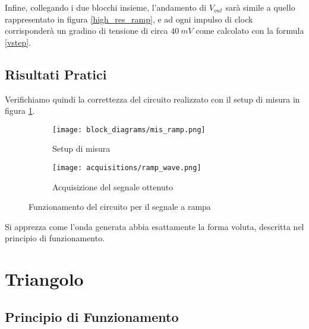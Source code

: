 Infine, collegando i due blocchi insieme, l'andamento di $V_{out}$ sarà simile a quello
rappresentato in figura \ref{high_res_ramp}, e ad ogni impulso di clock corrisponderà un
gradino di tensione di circa $40\ mV$ come calcolato con la formula \ref{vstep}.


\subsection*{Risultati Pratici}


Verifichiamo quindi la correttezza del circuito realizzato con il setup di misura in figura
\ref{mis_ramp}.

\begin{figure}[H]
    \centering

    \begin{subfigure}{.5\textwidth}
        \centering
        \texttt{[image: block\_diagrams/mis\_ramp.png]}
        \caption{Setup di misura}
        \label{mis_ramp}
    \end{subfigure}%
    \begin{subfigure}{.5\textwidth}
        \centering
        \texttt{[image: acquisitions/ramp\_wave.png]}
        \caption{Acquisizione del segnale ottenuto}
        \label{acq_ramp}
    \end{subfigure}

    \caption{Funzionamento del circuito per il segnale a rampa}
    \label{acq_ramp_signals}
\end{figure}

Si apprezza come l'onda generata abbia esattamente la forma voluta, descritta nel
principio di funzionamento.


\section{Triangolo}


\subsection*{Principio di Funzionamento}

